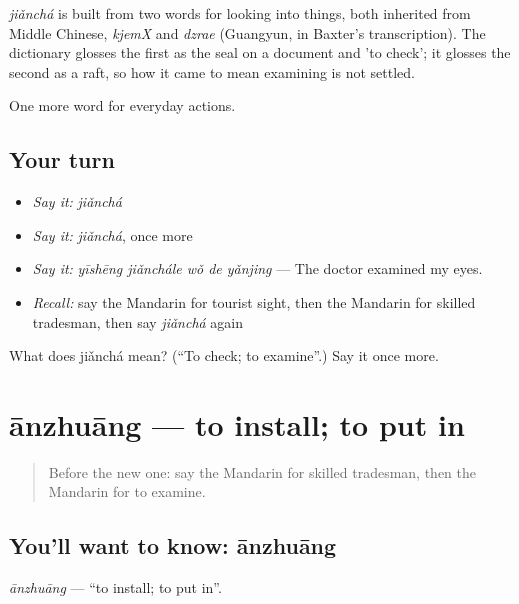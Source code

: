 \begin{cousinweb}
\emph{jiǎnchá} is built from two words for looking into things, both inherited from Middle Chinese, \emph{kjemX} and \emph{dzrae} (Guangyun, in Baxter's transcription). The dictionary glosses the first as the seal on a document and 'to check'; it glosses the second as a raft, so how it came to mean examining is not settled.
\end{cousinweb}

\begin{grammarlens}[title={What you've built}]
One more word for everyday actions.
\end{grammarlens}

\subsection*{Your turn}
\begin{itemize}
\raggedright
  \item \emph{Say it:} \emph{jiǎnchá}
  \item \emph{Say it:} \emph{jiǎnchá}, once more
  \item \emph{Say it:} \emph{yīshēng jiǎnchále wǒ de yǎnjing} — The doctor examined my eyes.
  \item \emph{Recall:} say the Mandarin for tourist sight, then the Mandarin for skilled tradesman, then say \emph{jiǎnchá} again
\end{itemize}

\begin{tcolorbox}[breakable,colback=teal!4,colframe=teal!35!black,title={Before you move on}]
What does jiǎnchá mean? (\textquotedblleft{}To check; to examine\textquotedblright{}.) Say it once more.
\end{tcolorbox}
\section[ānzhuāng]{ānzhuāng — to install; to put in}

\label{lesson:ZH-C208-anzhuang}



\begin{quote}
Before the new one: say the Mandarin for skilled tradesman, then the Mandarin for to examine.
\end{quote}

\subsection*{You'll want to know: ānzhuāng}
\emph{ānzhuāng} — \textquotedblleft{}to install; to put in\textquotedblright{}.

